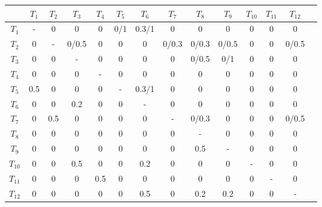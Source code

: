     \begin{table}[h!]
      \centering
      \small
      \begin{tabular}{c|ccccccccccccc}
        & $T_1$ & $T_2$ & $T_3$ & $T_4$ & $T_5$ & $T_6$ & $T_7$ & $T_8$ & $T_9$ & $T_{10}$ & $T_{11}$ & $T_{12}$ \\
        \hline
        $T_1$       & -     & 0     & 0         & 0     & 0/1   & 0.3/1     & 0         & 0         & 0         & 0     & 0     & 0         \\
        $T_2$       & 0     & -     & 0/0.5     & 0     & 0     & 0         & 0/0.3     & 0/0.3     & 0/0.5     & 0     & 0     & 0/0.5     \\
        $T_3$       & 0     & 0     & -         & 0     & 0     & 0         & 0         & 0/0.5     & 0/1       & 0     & 0     & 0         \\
        $T_4$       & 0     & 0     & 0         & -     & 0     & 0         & 0         & 0         & 0         & 0     & 0     & 0         \\
        $T_5$       & 0.5   & 0     & 0         & 0     & -     & 0.3/1     & 0         & 0         & 0         & 0     & 0     & 0         \\
        $T_6$       & 0     & 0     & 0.2       & 0     & 0     & -         & 0         & 0         & 0         & 0     & 0     & 0         \\
        $T_7$       & 0     & 0.5   & 0         & 0     & 0     & 0         & -         & 0/0.3     & 0         & 0     & 0     & 0/0.5     \\
        $T_8$       & 0     & 0     & 0         & 0     & 0     & 0         & 0         & -         & 0         & 0     & 0     & 0         \\
        $T_9$       & 0     & 0     & 0         & 0     & 0     & 0         & 0         & 0.5       & -         & 0     & 0     & 0         \\
        $T_{10}$    & 0     & 0     & 0.5       & 0     & 0     & 0.2       & 0         & 0         & 0         & -     & 0     & 0         \\
        $T_{11}$    & 0     & 0     & 0         & 0.5   & 0     & 0         & 0         & 0         & 0         & 0     & -     & 0         \\
        $T_{12}$    & 0     & 0     & 0         & 0     & 0     & 0.5       & 0         & 0.2       & 0.2       & 0     & 0     & -         \\
      \end{tabular}
    \end{table}

